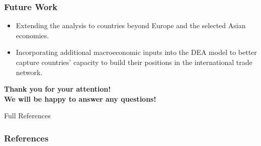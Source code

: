 \documentclass[aspectratio=169]{beamer}
\begin{document}
\begin{frame}
    \frametitle{Future Work}

    \begin{itemize}
       \item Extending the analysis to countries beyond Europe and the selected Asian economies.
       \item Incorporating additional macroeconomic inputs into the DEA model to better capture countries’ capacity to build their positions in the international trade network.
           
    \end{itemize}
    

    
    \vfill %
    
    \centering
    \Large{\textbf{Thank you for your attention! \\ We will be happy to answer any questions!}}
\end{frame}


\begin{frame}{Full References}
  \frametitle{References}
  \footnotesize
  \tiny
 \end{frame}

\end{document}
